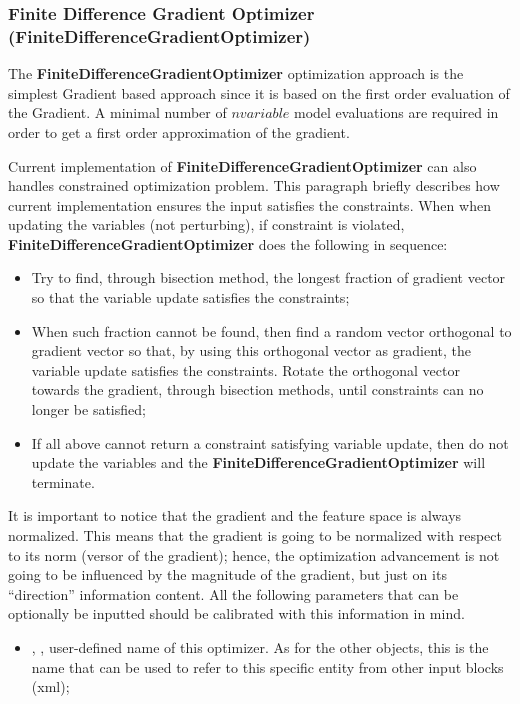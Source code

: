 \subsubsection{Finite Difference Gradient Optimizer (FiniteDifferenceGradientOptimizer)}
\label{subsubsubsec:FiniteDifferenceGradientOptimizer}
The \textbf{FiniteDifferenceGradientOptimizer} optimization approach is  the simplest Gradient based approach since it is based on the
first order evaluation of the Gradient.  A minimal number of $n variable$
model evaluations are required in order to get a first order approximation of the gradient.

Current implementation of \textbf{FiniteDifferenceGradientOptimizer} can also handles
constrained optimization problem. This paragraph briefly describes how current implementation ensures the input satisfies the
constraints. When when updating the variables (not perturbing), if constraint is violated, \textbf{FiniteDifferenceGradientOptimizer} does the following in
sequence:
\begin{itemize}
\item Try to find, through bisection method, the longest fraction of gradient vector so that the variable update satisfies the
constraints;
\item When such fraction cannot be found, then find a random vector orthogonal to gradient vector so that, by using this
orthogonal vector as gradient, the variable update satisfies the constraints. Rotate the orthogonal vector towards the gradient,
through bisection methods, until constraints can no longer be satisfied;
\item If all above cannot return a constraint satisfying variable update, then do not update the variables and the \textbf{FiniteDifferenceGradientOptimizer} will
terminate.
\end{itemize}

It is important to notice that the gradient and the feature space is always normalized. This means that the gradient is going to be
normalized with respect to its norm (versor of the gradient); hence, the optimization advancement is not going to be influenced by the
magnitude of the gradient, but just on its ``direction'' information content. All the following parameters that can be optionally be inputted
should be calibrated with this information in mind.
%

%
\attrsIntro
\vspace{-5mm}
\begin{itemize}
\itemsep0em
\item {}, , user-defined name of this optimizer. \nb As for the other objects, this is
the name that can be used to refer to this specific entity from other input blocks (xml);
\end{itemize}
\vspace{-5mm}

